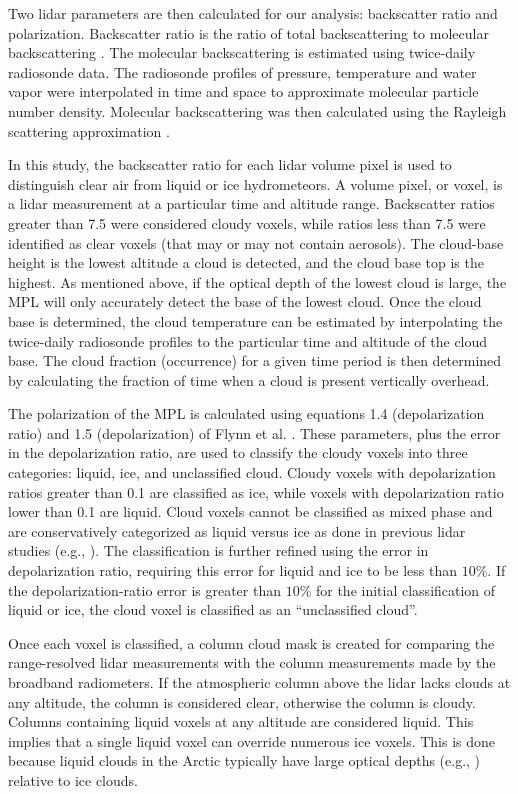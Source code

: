 Two lidar parameters are then calculated for our analysis: backscatter ratio and polarization. Backscatter ratio is the ratio of total backscattering to molecular backscattering \cite{klett:1981}. The molecular backscattering is estimated using twice-daily radiosonde data. The radiosonde profiles of pressure, temperature and water vapor were interpolated in time and space to approximate molecular particle number density. Molecular backscattering was then calculated using the Rayleigh scattering approximation \cite{bohren:2006, bohren:2008, placzek:1934}. 

In this study, the backscatter ratio for each lidar volume pixel is used to distinguish clear air from liquid or ice hydrometeors. A volume pixel, or voxel, is a lidar measurement at a particular time and altitude range. Backscatter ratios greater than 7.5 were considered cloudy voxels, while ratios less than 7.5 were identified as clear voxels (that may or may not contain aerosols). The cloud-base height is the lowest altitude a cloud is detected, and the cloud base top is the highest. As mentioned above, if the optical depth of the lowest cloud is large, the MPL will only accurately detect the base of the lowest cloud. Once the cloud base is determined, the cloud temperature can be estimated by interpolating the twice-daily radiosonde profiles to the particular time and altitude of the cloud base. The cloud fraction (occurrence) for a given time period is then determined by calculating the fraction of time when a cloud is present vertically overhead.

The polarization of the MPL is calculated using equations 1.4 (depolarization ratio) and 1.5 (depolarization) of Flynn et al. \cite{flynn:2007}. These parameters, plus the error in the depolarization ratio, are used to classify the cloudy voxels into three categories: liquid, ice, and unclassified cloud. Cloudy voxels with depolarization ratios greater than 0.1 are classified as ice, while voxels with depolarization ratio lower than 0.1 are liquid. Cloud voxels cannot be classified as mixed phase and are conservatively categorized as liquid versus ice as done in previous lidar studies (e.g., \cite{intrieri:2002}). The classification is further refined using the error in depolarization ratio, requiring this error for liquid and ice to be less than $10 \%$. If the depolarization-ratio error is greater than $10 \%$ for the initial classification of liquid or ice, the cloud voxel is classified as an “unclassified cloud”. 

Once each voxel is classified, a column cloud mask is created for comparing the range-resolved lidar measurements with the column measurements made by the broadband radiometers. If the atmospheric column above the lidar lacks clouds at any altitude, the column is considered clear, otherwise the column is cloudy. Columns containing liquid voxels at any altitude are considered liquid. This implies that a single liquid voxel can override numerous ice voxels. This is done because liquid clouds in the Arctic typically have large optical depths (e.g., \cite{curry:1996}) relative to ice clouds.

